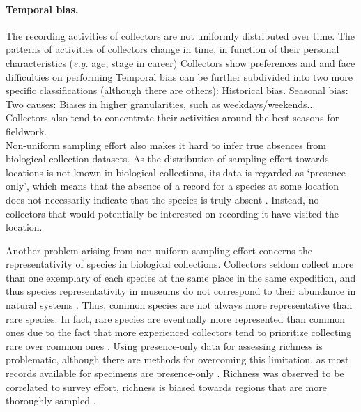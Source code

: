 \paragraph*{Temporal bias.}
The recording activities of collectors are not uniformly distributed over time.
The patterns of activities of collectors change in time, in function of their personal characteristics (\textit{e.g.} age, stage in career)
Collectors show preferences and and face difficulties on performing 
Temporal bias can be further subdivided into two more specific classifications (although there are others):
Historical bias. 
Seasonal bias: Two causes: 
Biases in higher granularities, such as weekdays/weekends...
Collectors also tend to concentrate their activities around the best seasons for fieldwork. \\










Non-uniform sampling effort also makes it hard to infer true absences from biological collection datasets.
As the distribution of sampling effort towards locations is not known in biological collections, its data is regarded as `presence-only', which means that the absence of a record for a species at some location does not necessarily indicate that the species is truly absent \cite{Graham2004}.
Instead, no collectors that would potentially be interested on recording it have visited the location.

Another problem arising from non-uniform sampling effort concerns the representativity of species in biological collections.
Collectors seldom collect more than one exemplary of each species at the same place in the same expedition, and thus species representativity in museums do not correspond to their abundance in natural systems \cite{TerSteege2011}.
Thus, common species are not always more representative than rare species.
In fact, rare species are eventually more represented than common ones due to the fact that more experienced collectors tend to prioritize collecting rare over common ones \cite{Nelson1990}.
Using presence-only data for assessing richness is problematic, although there are methods for overcoming this limitation, as most records available for specimens are presence-only \cite{Zaniewski2002}.
Richness was observed to be correlated to survey effort, richness is biased towards regions that are more thoroughly sampled \cite{Hortal2007}.







